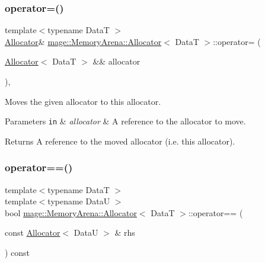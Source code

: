 \subsubsection{\texorpdfstring{operator=()}{operator=()}\hspace{0.1cm}{\footnotesize\ttfamily [2/2]}}
{\footnotesize\ttfamily template$<$typename DataT $>$ \\
\mbox{\hyperlink{classmage_1_1_memory_arena_1_1_allocator}{Allocator}}\& \mbox{\hyperlink{classmage_1_1_memory_arena_1_1_allocator}{mage\+::\+Memory\+Arena\+::\+Allocator}}$<$ DataT $>$\+::operator= (\begin{DoxyParamCaption}\item[{\mbox{\hyperlink{classmage_1_1_memory_arena_1_1_allocator}{Allocator}}$<$ DataT $>$ \&\&}]{allocator }\end{DoxyParamCaption})\hspace{0.3cm}{\ttfamily [default]}, {\ttfamily [noexcept]}}

Moves the given allocator to this allocator.


\begin{DoxyParams}[1]{Parameters}
\mbox{\tt in}  & {\em allocator} & A reference to the allocator to move. \\
\hline
\end{DoxyParams}
\begin{DoxyReturn}{Returns}
A reference to the moved allocator (i.\+e. this allocator). 
\end{DoxyReturn}
\mbox{\label{classmage_1_1_memory_arena_1_1_allocator_a7f7971d1bd4522ef847d30d1c5cf3666}} 
\subsubsection{\texorpdfstring{operator==()}{operator==()}}
{\footnotesize\ttfamily template$<$typename DataT $>$ \\
template$<$typename DataU $>$ \\
bool \mbox{\hyperlink{classmage_1_1_memory_arena_1_1_allocator}{mage\+::\+Memory\+Arena\+::\+Allocator}}$<$ DataT $>$\+::operator== (\begin{DoxyParamCaption}\item[{const \mbox{\hyperlink{classmage_1_1_memory_arena_1_1_allocator}{Allocator}}$<$ DataU $>$ \&}]{rhs }\end{DoxyParamCaption}) const\hspace{0.3cm}{\ttfamily [noexcept]}}


